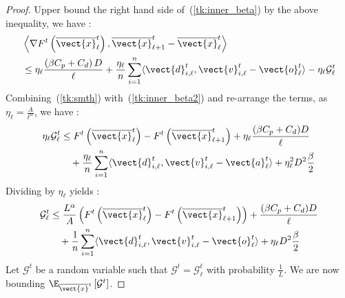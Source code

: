 \begin{proof}
Upper bound  the right hand side of~(\ref{tk:inner_beta}) by the above inequality, we have :
%
    \begin{align}	\label{tk:inner_beta2}
        &\left \langle \nabla F^{t} \left( \overline{\vect{x}}^t_{\ell} \right), \overline{\vect{x}}^t_{\ell+1} - \overline{\vect{x}}^t_{\ell} \right \rangle \notag \\
         &\leq \eta_{\ell}\frac{\left( \beta C_p + C_d\right)D }{\ell}
          +  \frac{\eta_{\ell}}{n} \sum_{i=1}^{n}\langle \vect{d}^t_{i,\ell}, \vect{v}^t_{i,\ell} - \vect{o}^t_{\ell} \rangle - \eta_{\ell}\mathcal{G}^t_{\ell} 
    \end{align}
%
Combining~(\ref{tk:smth}) with~(\ref{tk:inner_beta2}) and re-arrange the terms, as $\eta_{\ell} = \frac{A}{\ell^{\alpha}}$, we have : 
    \begin{align}	\label{tk:gap_eta_ell}
         \eta_{\ell} \mathcal{G}^t_{\ell} 
        & \leq F^{t} \left( \overline{\vect{x}}^t_{\ell} \right) - F^{t} \left( \overline{\vect{x}}^t_{\ell+1} \right) + \eta_{\ell} \frac{(\beta C_p + C_d)D}{\ell} \notag \\
        & \quad + \frac{\eta_{\ell}}{n} \sum_{i=1}^{n}\langle \vect{d}^t_{i,\ell}, \vect{v}^t_{i,\ell} - \vect{a}^t_{\ell} \rangle + \eta^2_{\ell}D^2 \frac{\beta}{2} 
    \end{align}
%
Dividing by $\eta_{\ell}$ yields :
%
    \begin{align}	\label{tk:gap_ell}
        \mathcal{G}^t_{\ell} 
        & \leq \frac{L^{\alpha}}{A} \left( F^{t} \left( \overline{\vect{x}}^t_{\ell} \right) - F^{t} \left( \overline{\vect{x}}^t_{\ell+1} \right) \right) + \frac{(\beta C_p + C_d)D}{\ell} \notag \\
        & \quad + \frac{1}{n} \sum_{i=1}^{n}\langle \vect{d}^t_{i,\ell}, \vect{v}^t_{i,\ell} - \vect{o}^t_{\ell} \rangle + \eta_{\ell}D^2 \frac{\beta}{2}
    \end{align}
%
Let $\mathcal{G}^t$ be a random variable such that $\mathcal{G}^t = \mathcal{G}^t_{\ell}$ with probability $\frac{1}{L}$. 
We are now bounding $\E_{\overline{\vect{x}}^t} \left[ \mathcal{G}^t \right]$.

\end{proof}
